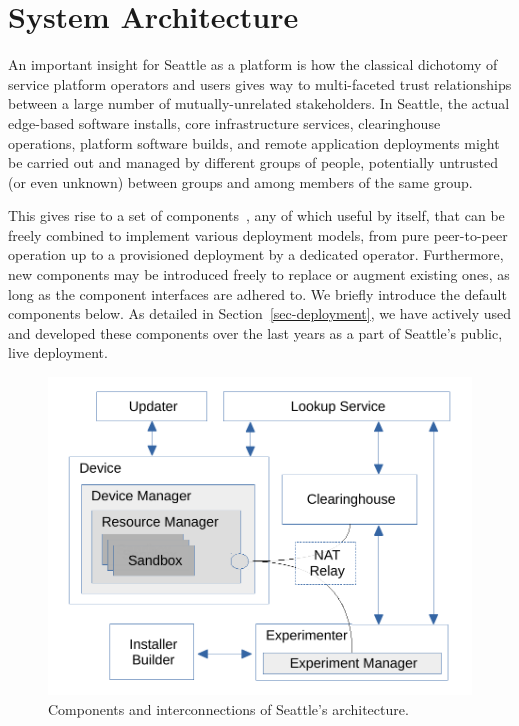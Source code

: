 \section{System Architecture}

An important insight for Seattle as a platform is how the classical
dichotomy of service platform operators and users gives way to multi-faceted
trust relationships between a large number of mutually-unrelated
stakeholders.
In Seattle, the actual edge-based software installs, core infrastructure
services, clearinghouse operations, platform software builds, and remote
application deployments might be carried out and managed by different
groups of people, potentially untrusted (or even unknown) between groups
and among members of the same group.

This gives rise to a set of components~\cite{Cappos2009},
any of which useful
by itself, that can be freely combined to implement various
deployment models, from pure peer-to-peer operation up to a
provisioned deployment by a dedicated operator. Furthermore,
new components may be introduced freely to replace or augment
existing ones, as long as the component interfaces are adhered to.
We briefly introduce the default components below.
As detailed in Section~\ref{sec-deployment}, we have actively used
and developed these components over the last years as a part of
Seattle's public, live deployment.

\begin{figure}
  \centering
  \includegraphics[width=\columnwidth]{figures/components.pdf}
  \caption{Components and interconnections of Seattle's architecture.}
  \label{fig:arch}
\end{figure}


